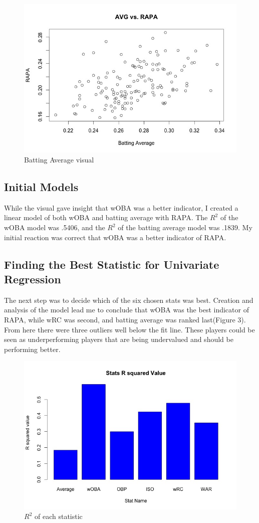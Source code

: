 \documentclass[12pt]{article}
\begin{document}
\begin{figure}[h]
\centering
\includegraphics[width=4.5in]{Average.jpeg}
\caption{Batting Average visual}
\end{figure}
 
\subsection{Initial Models}

\qquad While the visual gave insight that wOBA was a better indicator, I created a linear model of both wOBA and batting average with RAPA. The $R^2$ of the wOBA model was .5406, and the $R^2$ of the batting average model was .1839. My initial reaction was correct that wOBA was a better indicator of RAPA. 

\subsection{Finding the Best Statistic for Univariate Regression}
\qquad The next step was to decide which of the six chosen stats was best. Creation and analysis of the model lead me to conclude that wOBA was the best indicator of RAPA, while wRC was second, and batting average was ranked last(Figure 3). From here there were three outliers well below the fit line. These players could be seen as underperforming players that are being undervalued and should be performing better.  

\begin{figure}[h]
\centering
\includegraphics[width=4.5in]{Rsquared.jpeg}
\caption{$R^2$ of each statistic}
\end{figure}
\end{document}
